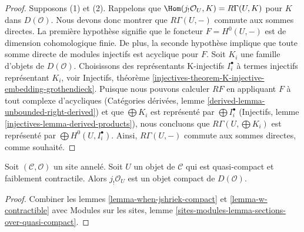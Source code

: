 \begin{proof}
Supposons (1) et (2). Rappelons que
$\Hom(j_!\mathcal{O}_U, K) = R\Gamma(U, K)$ pour $K$ dans $D(\mathcal{O})$.
Nous devons donc montrer que $R\Gamma(U, -)$ commute aux sommes directes. La
première hypothèse signifie que le foncteur $F = H^0(U, -)$ est de dimension
cohomologique finie. De plus, la seconde hypothèse implique que toute somme
directe de modules injectifs est acyclique pour $F$. Soit $K_i$ une famille
d'objets de $D(\mathcal{O})$. Choisissons des représentants K-injectifs
$I_i^\bullet$ à termes injectifs représentant $K_i$, voir Injectifs,
théorème \ref{injectives-theorem-K-injective-embedding-grothendieck}. Puisque
nous pouvons calculer $RF$ en appliquant $F$ à tout complexe d'acycliques
(Catégories dérivées, lemme \ref{derived-lemma-unbounded-right-derived}) et
que $\bigoplus K_i$ est représenté par $\bigoplus I_i^\bullet$ (Injectifs,
lemme \ref{injectives-lemma-derived-products}), nous concluons que
$R\Gamma(U, \bigoplus K_i)$ est représenté par
$\bigoplus H^0(U, I_i^\bullet)$. Ainsi, $R\Gamma(U, -)$ commute aux sommes
directes, comme souhaité.
\end{proof}

\begin{lemma}
\label{lemma-quasi-compact-weakly-contractible-compact}
Soit $(\mathcal{C}, \mathcal{O})$ un site annelé. Soit $U$ un objet de
$\mathcal{C}$ qui est quasi-compact et faiblement contractile. Alors
$j_!\mathcal{O}_U$ est un objet compact de $D(\mathcal{O})$.
\end{lemma}

\begin{proof}
Combiner les lemmes \ref{lemma-when-jshriek-compact} et
\ref{lemma-w-contractible} avec Modules sur les sites, lemme
\ref{sites-modules-lemma-sections-over-quasi-compact}.
\end{proof}

